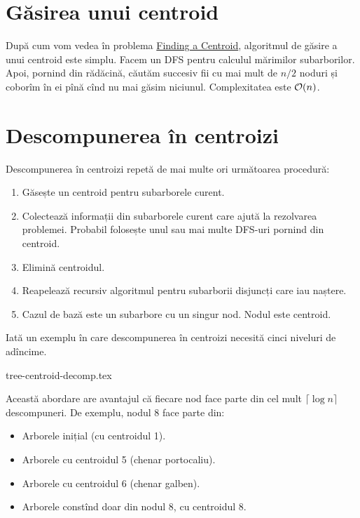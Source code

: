 \documentclass[../main.tex]{subfiles}
\begin{document}
\section{Găsirea unui centroid}

După cum vom vedea în problema \hyperref[problem:finding-a-centroid]{Finding a Centroid}, algoritmul de găsire a unui centroid este simplu. Facem un DFS pentru calculul mărimilor subarborilor. Apoi, pornind din rădăcină, căutăm succesiv fii cu mai mult de $n/2$ noduri și coborîm în ei pînă cînd nu mai găsim niciunul. Complexitatea este $\mathcal{O}(n)$.

\section{Descompunerea în centroizi}

Descompunerea în centroizi repetă de mai multe ori următoarea procedură:

\begin{enumerate}
  \item Găsește un centroid pentru subarborele curent.

  \item Colectează informații din subarborele curent care ajută la rezolvarea problemei. Probabil folosește unul sau mai multe DFS-uri pornind din centroid.

  \item Elimină centroidul.

  \item Reapelează recursiv algoritmul pentru subarborii disjuncți care iau naștere.

  \item Cazul de bază este un subarbore cu un singur nod. Nodul este centroid.
\end{enumerate}

Iată un exemplu în care descompunerea în centroizi necesită cinci niveluri de adîncime.

{tree-centroid-decomp.tex}

Această abordare are avantajul că fiecare nod face parte din cel mult $\lceil \log n \rceil$ descompuneri. De exemplu, nodul 8 face parte din:

\begin{itemize}
  \item Arborele inițial (cu centroidul 1).
  \item Arborele cu centroidul 5 (chenar portocaliu).
  \item Arborele cu centroidul 6 (chenar galben).
  \item Arborele constînd doar din nodul 8, cu centroidul 8.
\end{itemize}
\end{document}
